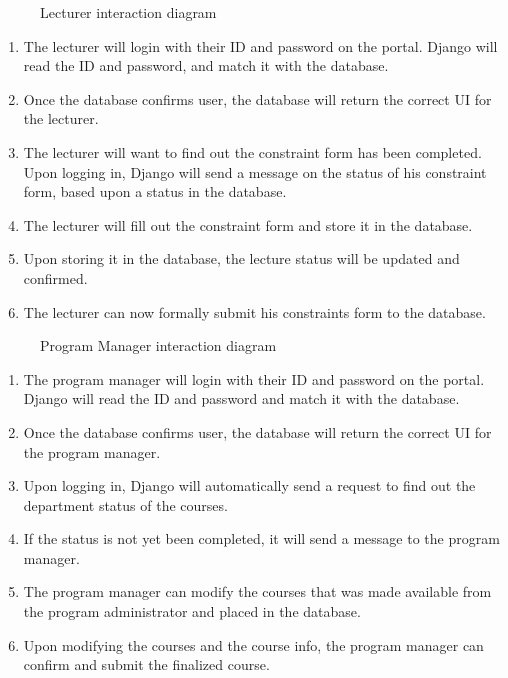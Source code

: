 \documentclass[12pt,article]{memoir}
\begin{document}
\begin{figure}[htb]
\caption{Lecturer interaction diagram}
\end{figure}

\begin{enumerate}
\item The lecturer will login with their ID and password on the portal. Django will read the ID and password, and match it with the database. 
\item Once the database confirms user, the database will return the correct UI for the lecturer.
\item The lecturer will want to find out the constraint form has been completed. Upon logging in, Django will send a message on the status of his constraint form, based upon a status in the database.
\item The lecturer will fill out the constraint form and store it in the database.
\item Upon storing it in the database, the lecture status will be updated and confirmed. 
\item The lecturer can now formally submit his constraints form to the database. 
\end{enumerate}

\begin{figure}[htb]
\caption{Program Manager interaction diagram}
\end{figure}

\begin{enumerate}
\item The program manager will login with their ID and password on the portal. Django will read the ID and password and match it with the database. 
\item Once the database confirms user, the database will return the correct UI for the program manager.
\item Upon logging in, Django will automatically send a request to find out the department status of the courses. 
\item If the status is not yet been completed, it will send a message to the program manager.
\item The program manager can modify the courses that was made available from the program administrator and placed in the database. 
\item Upon modifying the courses and the course info, the program manager can confirm and submit the finalized course. 
\end{enumerate}
\end{document}
